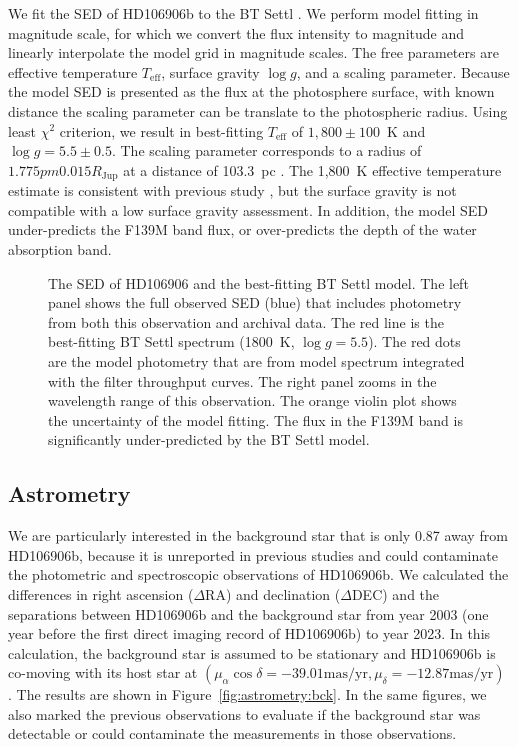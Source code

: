 \documentclass[modern]{aastex62}
\begin{document}
We fit the SED of HD106906b to the BT Settl \citep[][Figure~\ref{fig:SED}]{Allard2012}. We perform model fitting in magnitude scale, for which we convert the flux intensity to magnitude and linearly interpolate the model grid in magnitude scales. The free parameters are effective temperature $T_{\mathrm{eff}}$, surface gravity $\log g$, and a scaling parameter. Because the model SED is presented as the flux at the photosphere surface, with known distance the scaling parameter can be translate to the photospheric radius. Using least $\chi^{2}$ criterion, we result in best-fitting $T_{\mathrm{eff}}$ of $1,800\pm100$~K and $\log g=5.5\pm0.5$.  The scaling parameter corresponds to a radius of  $1.775pm0.015R_{\mathrm{Jup}}$ at a distance of 103.3~pc \citep{Gaia2018,Gaia2016}. The 1,800~K effective temperature estimate is consistent with previous study \citep{Bailey2013,Wu2016}, but the surface gravity is not compatible with a low surface gravity assessment. In addition, the model SED under-predicts the F139M band flux, or over-predicts the depth of the water absorption band.

\begin{figure}
  \centering
  \caption{The SED of HD106906 and the best-fitting BT Settl model. The left panel shows the full observed SED (blue) that includes photometry from both this observation and archival data. The red line is the best-fitting BT Settl spectrum (1800~K, $\log g=5.5$). The red dots are the model photometry that are from model spectrum integrated with the filter throughput curves. The right panel zooms in the wavelength range of this observation. The orange violin plot shows the uncertainty of the model fitting. The flux in the F139M band is significantly under-predicted by the BT Settl model.}
  \label{fig:SED}
\end{figure}

\subsection{Astrometry}
\label{sec:astrometry}
We are particularly interested in the background star that is only 0\arcsec{}.87 away from HD106906b, because it is unreported in previous studies and could contaminate the photometric and spectroscopic observations of HD106906b. We calculated the differences in right ascension ($\Delta$RA) and declination ($\Delta$DEC) and the separations between HD106906b and the background star from year 2003 (one year before the first direct imaging record of HD106906b) to year 2023. In this calculation, the background star is assumed to be stationary and HD106906b is co-moving with its host star at $(\mu_\alpha\cos\delta=-39.01 \mbox{mas/yr}, \mu_{\delta}=-12.87 \mbox{mas/yr})$ \citep{Gaia2016, Gaia2018}. The results are shown in Figure~\ref{fig:astrometry:bck}. In the same figures, we also marked the previous observations \citep{Bailey2013, Wu2016, Lagrange2016, Daemgen2017} to evaluate if the background star was detectable or could contaminate the measurements in those observations.
\end{document}
